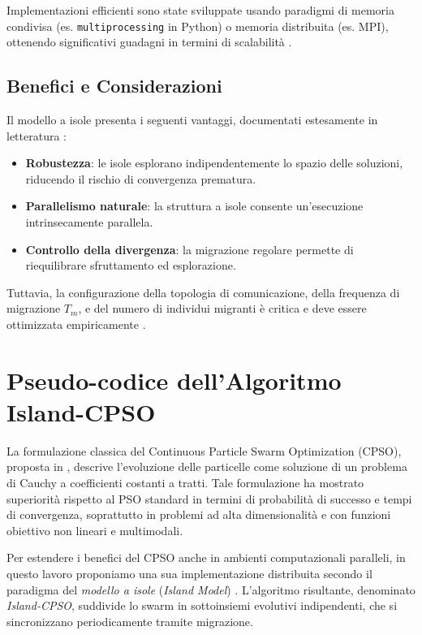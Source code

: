 \documentclass{article}
\begin{document}
Implementazioni efficienti sono state sviluppate usando paradigmi di memoria condivisa (es. \texttt{multiprocessing} in Python) o memoria distribuita (es. MPI), ottenendo significativi guadagni in termini di scalabilità \cite{alba2002parallelism, li2019openbox}.

\subsection{Benefici e Considerazioni}

Il modello a isole presenta i seguenti vantaggi, documentati estesamente in letteratura \cite{cantupaz1998survey, tomassini2005spatially}:

\begin{itemize}
    \item \textbf{Robustezza}: le isole esplorano indipendentemente lo spazio delle soluzioni, riducendo il rischio di convergenza prematura.
    \item \textbf{Parallelismo naturale}: la struttura a isole consente un'esecuzione intrinsecamente parallela.
    \item \textbf{Controllo della divergenza}: la migrazione regolare permette di riequilibrare sfruttamento ed esplorazione.
\end{itemize}

Tuttavia, la configurazione della topologia di comunicazione, della frequenza di migrazione $T_m$, e del 
numero di individui migranti è critica e deve essere ottimizzata empiricamente \cite{alba2002parallelism}.

\section{Pseudo-codice dell'Algoritmo Island-CPSO}

La formulazione classica del Continuous Particle Swarm Optimization (CPSO), proposta in \cite{professoressa}, 
descrive l'evoluzione delle particelle come soluzione di un problema di Cauchy a coefficienti costanti a tratti. 
Tale formulazione ha mostrato superiorità rispetto al PSO standard in termini di probabilità di successo 
e tempi di convergenza, soprattutto in problemi ad alta dimensionalità e con funzioni obiettivo non 
lineari e multimodali.

Per estendere i benefici del CPSO anche in ambienti computazionali paralleli, in questo lavoro 
proponiamo una sua implementazione distribuita secondo il paradigma del \textit{modello a isole} 
(\textit{Island Model}) \cite{tomassini2005spatially, cantupaz1998survey}. L'algoritmo risultante, 
denominato \textit{Island-CPSO}, suddivide lo swarm in sottoinsiemi evolutivi indipendenti, che si 
sincronizzano periodicamente tramite migrazione.
\end{document}
